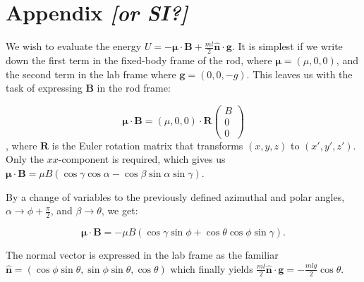 \documentclass[aps,prl,twocolumn,superscriptaddress]{revtex4-1}
\newcommand{\vcrm}[1]{\mathbf{#1}}
\newcommand{\hvcrm}[1]{\mathbf{\hat{#1}}}
\newcommand{\vc}[1]{\boldsymbol{#1}}
\newcommand{\ssa}[0]{\sin{\alpha}}
\newcommand{\cca}[0]{\cos{\alpha}}
\newcommand{\ccb}[0]{\cos{\beta}}
\newcommand{\ssc}[0]{\sin{\gamma}}
\newcommand{\ccc}[0]{\cos{\gamma}}
\newcommand{\sst}[0]{\sin{\theta}}
\newcommand{\cct}[0]{\cos{\theta}}
\newcommand{\ssp}[0]{\sin{\phi}}
\newcommand{\ccp}[0]{\cos{\phi}}
\newcommand{\vm}{\vc{\mu}}
\newcommand{\vn}{\hvcrm{n}}
\newcommand{\vB}{\vcrm{B}}
\begin{document}

\appendix*
\section{Appendix \emph{[or SI?]}}
We wish to evaluate the energy $U = -\vm \cdot\vB + \frac{ml}{2} \vn \cdot \vcrm{g}$. It is simplest if we write down the first term in the fixed-body frame of the rod, where $\vm=(\mu,0,0)$, and the second term in the lab frame where $\vcrm{g} = (0,0,-g)$. This leaves us with the task of expressing $\vB$ in the rod frame:

\begin{equation}
\vc{\mu}\cdot\vcrm{B}  =  (\mu,0,0) \cdot \vcrm{R} \begin{pmatrix} B \\ 0 \\ 0\end{pmatrix}
\end{equation}, where $\vcrm{R}$ is the Euler rotation matrix that transforms $(x,y,z)$ to $(x',y',z')$. Only the $xx$-component is required, which gives us $\vm \cdot\vB = \mu B (\ccc\cca - \ccb\ssa\ssc)$.

By a change of variables to the previously defined azimuthal and polar angles, $\alpha\rightarrow\phi+\frac{\pi}{2}$, and $\beta\rightarrow\theta$, we get:

\begin{equation}
\vm \cdot\vB  = -\mu B (\ccc\ssp + \cct\ccp\ssc).
\end{equation}

The normal vector is expressed in the lab frame as the familiar $\vn = (\ccp\sst, \ssp\sst, \cct)$ which finally yields $\frac{ml}{2}\hvcrm{n}\cdot\vcrm{g} = -\frac{mlg}{2}\cct$.




\end{document}
